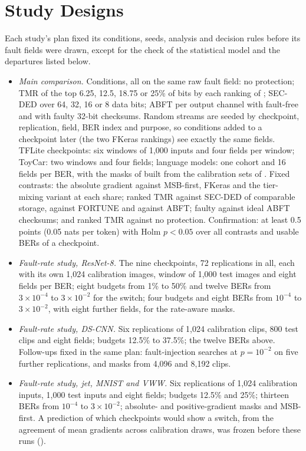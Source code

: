 \section{Study Designs}\label{app:designs}
Each study's plan fixed its conditions, seeds, analysis and decision rules before its fault fields were drawn, except for the check of the statistical model and the departures listed below.
\begin{itemize}
\item \emph{Main comparison.} Conditions, all on the same raw fault field: no protection; TMR of the top 6.25, 12.5, 18.75 or 25\% of bits by each ranking of ; SEC-DED over 64, 32, 16 or 8 data bits; ABFT per output channel with fault-free and with faulty 32-bit checksums. Random streams are seeded by checkpoint, replication, field, BER index and purpose, so conditions added to a checkpoint later (the two FKeras rankings) see exactly the same fields. TFLite checkpoints: six windows of 1,000 inputs and four fields per window; ToyCar: two windows and four fields; language models: one cohort and 16 fields per BER, with the masks of  built from the calibration sets of . Fixed contrasts: the absolute gradient against MSB-first, FKeras and the tier-mixing variant at each share; ranked TMR against SEC-DED of comparable storage, against FORTUNE and against ABFT; faulty against ideal ABFT checksums; and ranked TMR against no protection. Confirmation: at least 0.5 points (0.05 nats per token) with Holm $p<0.05$ over all contrasts and usable BERs of a checkpoint.
\item \emph{Fault-rate study, ResNet-8.} The nine checkpoints, 72 replications in all, each with its own 1,024 calibration images, window of 1,000 test images and eight fields per BER; eight budgets from 1\% to 50\% and twelve BERs from $3\times10^{-4}$ to $3\times10^{-2}$ for the switch; four budgets and eight BERs from $10^{-4}$ to $3\times10^{-2}$, with eight further fields, for the rate-aware masks.
\item \emph{Fault-rate study, DS-CNN.} Six replications of 1,024 calibration clips, 800 test clips and eight fields; budgets 12.5\% to 37.5\%; the twelve BERs above. Follow-ups fixed in the same plan: fault-injection searches at $p=10^{-2}$ on five further replications, and masks from 4,096 and 8,192 clips.
\item \emph{Fault-rate study, jet, MNIST and VWW.} Six replications of 1,024 calibration inputs, 1,000 test inputs and eight fields; budgets 12.5\% and 25\%; thirteen BERs from $10^{-4}$ to $3\times10^{-2}$; absolute- and positive-gradient masks and MSB-first. A prediction of which checkpoints would show a switch, from the agreement of mean gradients across calibration draws, was frozen before these runs ().

\end{itemize}
